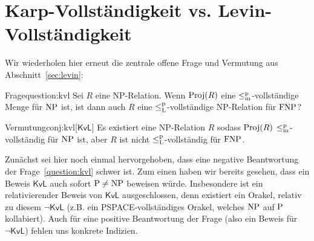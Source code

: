 
\section{Karp-Vollständigkeit vs. Levin-Vollständigkeit}\label{sec:karp-vs-levin}

Wir wiederholen hier erneut die zentrale offene Frage und Vermutung aus Abschnitt~\ref{sec:levin}:

\begin{reptheorem}{Frage}{question:kvl}
    Sei $R$ eine NP-Relation.
Wenn $\Proj(R)$ eine $\leqmp$-vollständige Menge für $\NP$ ist, ist dann auch $R$ eine $\leqlp$-vollständige NP-Relation für $\FNP$?
\end{reptheorem}

\begin{reptheorem}{Vermutung}{conj:kvl}[$\mathsf{KvL}$]
    Es existiert eine NP-Relation $R$ sodass $\Proj(R)$ $\leqmp$-vollständig für $\NP$ ist, aber $R$ ist nicht $\leqlp$-vollständig für $\FNP$.
\end{reptheorem}

Zunächst sei hier noch einmal hervorgehoben, dass eine negative Beantwortung der Frage~\ref{question:kvl} schwer ist. Zum einen haben wir bereits gesehen, dass ein Beweis $\mathsf{KvL}$ auch sofort $\P\neq\NP$ beweisen würde. Insbesondere ist ein relativierender Beweis von $\mathsf{KvL}$ ausgeschlossen, denn existiert ein Orakel, relativ zu diesem $\neg\mathsf{KvL}$ (z.B. ein PSPACE-vollständiges Orakel, welches $\NP$ auf $\P$ kollabiert).
Auch für eine positive Beantwortung der Frage (also ein Beweis für $\neg\mathsf{KvL}$) fehlen uns konkrete Indizien.

